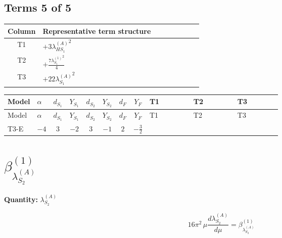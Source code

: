 \documentclass[8pt]{article}
\begin{document}
\begin{landscape}
\subsection*{Terms 5 of 5}
\begin{center}
\begin{tabular}{@{}c >{\raggedright\arraybackslash}p{0.82\linewidth}@{}}
\toprule
Column & Representative term structure \\
\midrule
T1 & \(\displaystyle +3 {\lambda_{HS_1}^{(A)}}^2\) \\
\midrule
T2 & \(\displaystyle +\frac{7 {\lambda_{S_1}^{(1)}}^2}{4}\) \\
\midrule
T3 & \(\displaystyle +22 {\lambda_{S_1}^{(A)}}^2\) \\
\midrule
\bottomrule
\end{tabular}
\end{center}
\smallskip
\tiny
\begin{longtable}{@{}llcccccc >{\raggedright\arraybackslash}p{0.21\linewidth} >{\raggedright\arraybackslash}p{0.21\linewidth} >{\raggedright\arraybackslash}p{0.21\linewidth}@{}}
\toprule
Model & $\alpha$ & $d_{S_1}$ & $Y_{S_1}$ & $d_{S_2}$ & $Y_{S_2}$ & $d_F$ & $Y_F$ & T1 & T2 & T3 \\
\midrule
\endfirsthead
\toprule
Model & $\alpha$ & $d_{S_1}$ & $Y_{S_1}$ & $d_{S_2}$ & $Y_{S_2}$ & $d_F$ & $Y_F$ & T1 & T2 & T3 \\
\midrule
\endhead
T3-E & $-4$ & $3$ & $-2$ & $3$ & $-1$ & $2$ & $-\frac{3}{2}$ & \scriptsize\adjustbox{max width=\linewidth}{$\begin{gathered} +3 {\lambda_{HS_1}^{(A)}}^2\end{gathered}$} & \scriptsize\adjustbox{max width=\linewidth}{$\begin{gathered} +\frac{7 {\lambda_{S_1}^{(1)}}^2}{4}\end{gathered}$} & \scriptsize\adjustbox{max width=\linewidth}{$\begin{gathered} +22 {\lambda_{S_1}^{(A)}}^2\end{gathered}$} \\
\midrule
\bottomrule
\end{longtable}
\clearpage
\section*{$\beta_{\lambda_{S_2}^{(A)}}^{(1)}$}
\noindent\textbf{Quantity: }$\lambda_{S_2}^{(A)}$\par\smallskip
\[16\pi^2\,\mu\frac{d \lambda_{S_2}^{(A)}}{d\mu}=\beta_{\lambda_{S_2}^{(A)}}^{(1)}\]

\end{landscape}
\end{document}
